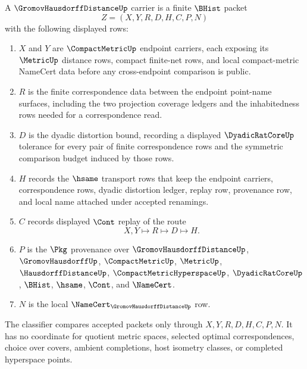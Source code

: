 \begin{definition}
\label{def:gromov-hausdorff-distance-carrier}
A $\GromovHausdorffDistanceUp$ carrier is a finite $\BHist$ packet
$$
Z=(X,Y,R,D,H,C,P,N)
$$
with the following displayed rows:
\begin{enumerate}
\item $X$ and $Y$ are $\CompactMetricUp$ endpoint carriers, each exposing its $\MetricUp$ distance rows, compact finite-net rows, and local compact-metric NameCert data before any cross-endpoint comparison is public.
\item $R$ is the finite correspondence data between the endpoint point-name surfaces, including the two projection coverage ledgers and the inhabitedness rows needed for a correspondence read.
\item $D$ is the dyadic distortion bound, recording a displayed $\DyadicRatCoreUp$ tolerance for every pair of finite correspondence rows and the symmetric comparison budget induced by those rows.
\item $H$ records the $\hsame$ transport rows that keep the endpoint carriers, correspondence rows, dyadic distortion ledger, replay row, provenance row, and local name attached under accepted renamings.
\item $C$ records displayed $\Cont$ replay of the route
$$
X,Y \longmapsto R \longmapsto D \longmapsto H .
$$
\item $P$ is the $\Pkg$ provenance over $\GromovHausdorffDistanceUp$, $\GromovHausdorffUp$, $\CompactMetricUp$, $\MetricUp$, $\HausdorffDistanceUp$, $\CompactMetricHyperspaceUp$, $\DyadicRatCoreUp$, $\BHist$, $\hsame$, $\Cont$, and $\NameCert$.
\item $N$ is the local $\NameCert_{\GromovHausdorffDistanceUp}$ row.
\end{enumerate}
The classifier compares accepted packets only through $X,Y,R,D,H,C,P,N$. It has no coordinate for quotient metric spaces, selected optimal correspondences, choice over covers, ambient completions, host isometry classes, or completed hyperspace points.
\end{definition}

